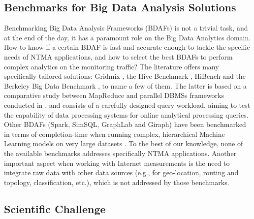 \documentclass[10pt, conference, letterpaper]{IEEEtran}
\begin{document}
\subsection{Benchmarks for Big Data Analysis Solutions}

Benchmarking Big Data Analysis Frameworks (BDAFs) is not a trivial task, and at the end of the day, it has a paramount role on the Big Data Analytics domain. How to know if a certain BDAF is fast and accurate enough to tackle the specific needs of NTMA applications, and how to select the best BDAFs to perform complex analytics on the monitoring traffic? The literature offers many specifically tailored solutions: Gridmix \cite{douglas}, the Hive Benchmark \cite{jia}, HiBench \cite{huang2010} and the Berkeley Big Data Benchmark \cite{berkeley2014}, to name a few of them. The latter is based on a comparative study between MapReduce and parallel DBMSs frameworks conducted in \cite{pavlo2009}, and consists of a carefully designed query workload, aiming to test the capability of data processing systems for online analytical processing queries. Other BDAFs (Spark, SimSQL, GraphLab and Giraph) have been benchmarked in terms of completion-time when running complex, hierarchical Machine Learning models on very large datasets \cite{cai2014}. To the best of our knowledge, none of the available benchmarks addresses specifically NTMA applications. Another important aspect when working with Internet measurements is the need to integrate raw data with other data sources (e.g., for geo-location, routing and topology, classification, etc.), which is not addressed by those benchmarks.

\subsection{Scientific Challenge}
\end{document}
